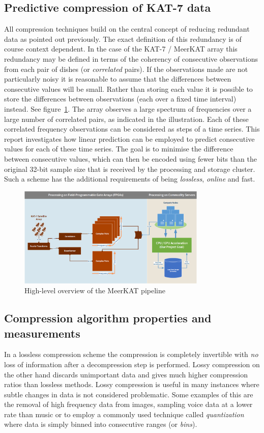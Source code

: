 \subsection{Predictive compression of KAT-7 data}
All compression techniques build on the central concept of reducing redundant data as pointed out previously. The exact definition of this redundancy is of course context 
dependent. In the case of the KAT-7 / MeerKAT array this redundancy may be defined in terms of the coherency of consecutive observations from each pair of dishes 
(or \textit{correlated} pairs). If the observations made are not particularly noisy it is reasonable to assume that the differences between consecutive values will be small.
Rather than storing each value it is possible to store the differences between observations (each over a fixed time interval) instead. See figure~\ref{MeerKAT_PIPELINE}. 
The array observes a large spectrum of frequencies over a large number of correlated pairs, as indicated in the illustration. Each of these correlated frequency 
observations can be considered as steps of a time series. This report investigates how linear prediction can be employed to predict consecutive values for each of these time 
series. The goal is to minimise the difference between consecutive values, which can then be encoded using fewer bits than the original 32-bit sample size that is received 
by the processing and storage cluster. Such a scheme has the additional requirements of being \textit{lossless}, \textit{online} and fast.

\begin{figure}[h!]
 \centering
 \includegraphics[width=0.8\textwidth]{Process.png}
 \caption{High-level overview of the MeerKAT pipeline}
 \label{MeerKAT_PIPELINE}
\end{figure}
\subsection{Compression algorithm properties and measurements}
In a lossless compression scheme the compression is completely invertible with \textit{no} loss of information after a decompression step is performed. Lossy
compression on the other hand discards unimportant data and gives much higher compression ratios than lossless methods. Lossy compression is useful in many
instances where subtle changes in data is not considered problematic. Some examples of this are the removal of high frequency data from images, sampling 
voice data at a lower rate than music or to employ a commonly used technique called \textit{quantization} where data is simply binned into consecutive ranges 
(or \textit{bins}).

